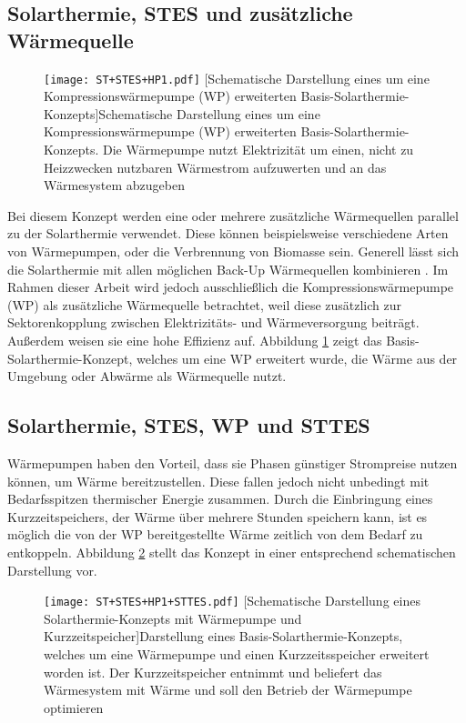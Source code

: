 \subsection*{Solarthermie, \ac{STES} und zusätzliche Wärmequelle} 
	\begin{figure}[ht]
		\centering
		\texttt{[image: ST+STES+HP1.pdf]}
		[Schematische Darstellung eines um eine Kompressionswärmepumpe (WP) erweiterten Basis-Solarthermie-Konzepts]{Schematische Darstellung eines um eine Kompressionswärmepumpe (WP) erweiterten Basis-Solarthermie-Konzepts. Die Wärmepumpe nutzt Elektrizität um einen, nicht zu Heizzwecken nutzbaren Wärmestrom aufzuwerten und an das Wärmesystem abzugeben}
		\label{fig: ST+STES+HP1}
	\end{figure}
Bei diesem Konzept werden eine oder mehrere zusätzliche Wärmequellen parallel zu der Solarthermie verwendet. Diese können beispielsweise verschiedene Arten von Wärmepumpen, oder die Verbrennung von Biomasse sein. Generell lässt sich die Solarthermie mit allen möglichen Back-Up Wärmequellen kombinieren \cite{RAD20161550}. Im Rahmen dieser Arbeit wird jedoch ausschließlich die Kompressionswärmepumpe (WP) als zusätzliche Wärmequelle betrachtet, weil diese zusätzlich zur Sektorenkopplung zwischen Elektrizitäts- und Wärmeversorgung beiträgt. Außerdem weisen sie eine hohe Effizienz auf. Abbildung \ref{fig: ST+STES+HP1} zeigt das Basis-Solarthermie-Konzept, welches um eine \ac{WP} erweitert wurde, die Wärme aus der Umgebung oder Abwärme als Wärmequelle nutzt.

\subsection*{Solarthermie, \ac{STES}, \ac{WP} und \ac{STTES}}
Wärmepumpen haben den Vorteil, dass sie Phasen günstiger Strompreise nutzen können, um Wärme bereitzustellen. Diese fallen jedoch nicht unbedingt mit Bedarfsspitzen thermischer Energie zusammen. Durch die Einbringung eines Kurzzeitspeichers, der Wärme über mehrere Stunden speichern kann, ist es möglich die von der \ac{WP} bereitgestellte Wärme zeitlich von dem Bedarf zu entkoppeln. Abbildung \ref{fig: ST+STES+HP1+STTES} stellt das Konzept in einer entsprechend schematischen Darstellung vor.
	\begin{figure}[ht]
		\centering
		\texttt{[image: ST+STES+HP1+STTES.pdf]}
		[Schematische Darstellung eines Solarthermie-Konzepts mit Wärmepumpe und Kurzzeitspeicher]{Darstellung eines Basis-Solarthermie-Konzepts, welches um eine Wärmepumpe und einen Kurzzeitsspeicher erweitert worden ist. Der Kurzzeitspeicher entnimmt und beliefert das Wärmesystem mit Wärme und soll den Betrieb der Wärmepumpe optimieren}
		\label{fig: ST+STES+HP1+STTES}
	\end{figure}

